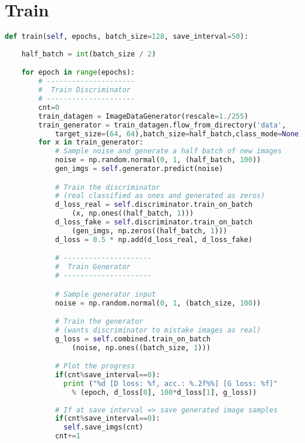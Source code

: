 
\section{Train} %
\label{sec:train}
\begin{lstlisting}[basicstyle=\scriptsize,language=Python]
def train(self, epochs, batch_size=128, save_interval=50):
    
    half_batch = int(batch_size / 2)

    for epoch in range(epochs):
        # ---------------------
        #  Train Discriminator
        # ---------------------
        cnt=0
        train_datagen = ImageDataGenerator(rescale=1./255)
        train_generator = train_datagen.flow_from_directory('data',
            target_size=(64, 64),batch_size=half_batch,class_mode=None)
        for x in train_generator:
            # Sample noise and generate a half batch of new images
            noise = np.random.normal(0, 1, (half_batch, 100))
            gen_imgs = self.generator.predict(noise)

            # Train the discriminator 
            # (real classified as ones and generated as zeros)
            d_loss_real = self.discriminator.train_on_batch
                (x, np.ones((half_batch, 1)))
            d_loss_fake = self.discriminator.train_on_batch
                (gen_imgs, np.zeros((half_batch, 1)))
            d_loss = 0.5 * np.add(d_loss_real, d_loss_fake)

            # ---------------------
            #  Train Generator
            # ---------------------

            # Sample generator input
            noise = np.random.normal(0, 1, (batch_size, 100))

            # Train the generator 
            # (wants discriminator to mistake images as real)
            g_loss = self.combined.train_on_batch
                (noise, np.ones((batch_size, 1)))

            # Plot the progress
            if(cnt%save_interval==0):
              print ("%d [D loss: %f, acc.: %.2f%%] [G loss: %f]" 
                % (epoch, d_loss[0], 100*d_loss[1], g_loss))
            
            # If at save interval => save generated image samples
            if(cnt%save_interval==0):
              self.save_imgs(cnt)
            cnt+=1
\end{lstlisting}

